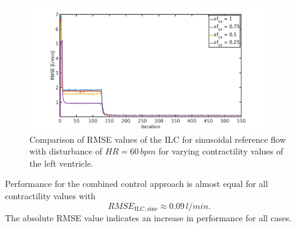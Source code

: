 \begin{figure}[ht!]
  \centering
  \includegraphics[width=0.9\textwidth]{images/chapt_5/ILC/RMSE_dist_sine_var_cf.pdf}
  \caption[RMSE Comparison of ILC at sinusoidal reference flow for varying left ventricular contractilities]{Comparison of RMSE values of the ILC for sinusoidal reference flow with disturbance of $HR=60\,bpm$ for varying contractility values of the left ventricle.}
  \label{fig:RMSE_dist_sine_var_cf}
\end{figure}
Performance for the combined control approach is almost equal for all contractility values with
\begin{equation}
  RMSE_{\mathrm{ILC,sine}}\approx 0.09\, l/min.
\end{equation}
The absolute RMSE value indicates an increase in performance for all cases.


